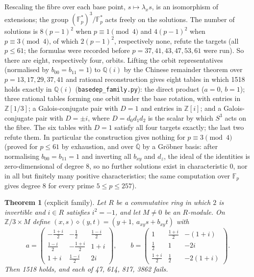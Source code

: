 \documentclass[11pt]{article}
\newtheorem{theorem}{Theorem}
\theoremstyle{remark}\newtheorem*{remark}{Remark}
\newcommand{\op}{\diamond}
\newcommand{\Z}{\mathbb{Z}}
\newcommand{\Q}{\mathbb{Q}}
\newcommand{\F}{\mathbb{F}}
\begin{document}
Rescaling the fibre over each base point, $s\mapsto\lambda_x s$, is an isomorphism of extensions; the group $(\F_p^{*})^{3}/\F_p^{*}$ acts freely on the solutions. The number of solutions is $8(p-1)^{2}$ when $p\equiv1\pmod 4$ and $4(p-1)^{2}$ when $p\equiv3\pmod 4$, of which $2(p-1)^{2}$, respectively none, refute the targets (all $p\le 61$; the formulas were recorded before $p=37,41,43,47,53,61$ were run). So there are eight, respectively four, orbits. Lifting the orbit representatives (normalised by $b_{00}=b_{11}=1$) to $\Q(i)$ by the Chinese remainder theorem over $p=13,17,29,37,41$ and rational reconstruction gives eight tables in which 1518 holds exactly in $\Q(i)$ (\texttt{basedep\_family.py}): the direct product ($a=0$, $b=1$); three rational tables forming one orbit under the base rotation, with entries in $\Z[1/3]$; a Galois-conjugate pair with $D=1$ and entries in $\Z[i]$; and a Galois-conjugate pair with $D=\pm i$, where $D=d_0d_1d_2$ is the scalar by which $S^{3}$ acts on the fibre. The six tables with $D=1$ satisfy all four targets exactly; the last two refute them. In particular the construction gives nothing for $p\equiv3\pmod4$ (proved for $p\le61$ by exhaustion, and over $\overline{\Q}$ by a Gr\"obner basis: after normalising $b_{00}=b_{11}=1$ and inverting all $b_{xy}$ and $d_z$, the ideal of the identities is zero-dimensional of degree 8, so no further solutions exist in characteristic 0, nor in all but finitely many positive characteristics; the same computation over $\F_p$ gives degree 8 for every prime $5\le p\le257$).

\begin{theorem}[explicit family]\label{thm:family}
Let $R$ be a commutative ring in which $2$ is invertible and $i\in R$ satisfies $i^{2}=-1$, and let $M\neq0$ be an $R$-module. On $\Z/3\times M$ define $(x,s)\op(y,t)=(y+1,\ a_{xy}s+b_{xy}t)$ with
\[
a=\begin{pmatrix}-\tfrac{1+i}{2}&-\tfrac12&\tfrac{1-i}{2}\\[2pt] \tfrac{1-i}{2}&-\tfrac{1+i}{2}&1+i\\[2pt] 1+i&\tfrac{1-i}{2}&2i\end{pmatrix},\qquad
b=\begin{pmatrix}1&\tfrac{1+i}{2}&-(1+i)\\[2pt] \tfrac12&1&-2i\\[2pt] \tfrac{1+i}{2}&\tfrac12&-2(1+i)\end{pmatrix}.
\]
Then 1518 holds, and each of 47, 614, 817, 3862 fails.
\end{theorem}
\end{document}
